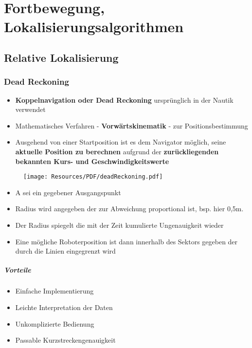 \chapter{Fortbewegung, Lokalisierungsalgorithmen}
\section{Relative Lokalisierung}
\subsection{Dead Reckoning}
\begin{itemize}
	\item \textbf{Koppelnavigation oder Dead Reckoning} ursprünglich in der
		Nautik verwendet
	\item Mathematisches Verfahren - \textbf{Vorwärtskinematik} - zur
		Positionsbestimmung
	\item Ausgehend von einer Startposition ist es dem Navigator möglich, seine
		\textbf{aktuelle Position zu berechnen} aufgrund der
		\textbf{zurückliegenden bekannten Kurs- und Geschwindigkeitswerte}
\end{itemize}
\begin{figure}[H]
	\begin{center}
		\texttt{[image: Resources/PDF/deadReckoning.pdf]}
		\caption{}
		\label{fig:PDF/deadReckoning.pdf}
	\end{center}
\end{figure}
\begin{itemize}
	\item A sei ein gegebener Ausgangspunkt
	\item Radius wird angegeben der zur Abweichung proportional ist, bsp. hier
		0,5m.
	\item Der Radius spiegelt die mit der Zeit kumulierte Ungenauigkeit wieder
	\item Eine mögliche Roboterposition ist dann innerhalb des Sektors gegeben
		der durch die Linien eingegrenzt wird
\end{itemize}

\paragraph{Vorteile}
\begin{itemize}
	\item Einfache Implementierung
	\item Leichte Interpretation der Daten
	\item Unkomplizierte Bedienung
	\item Passable Kurzstreckengenauigkeit
\end{itemize}

